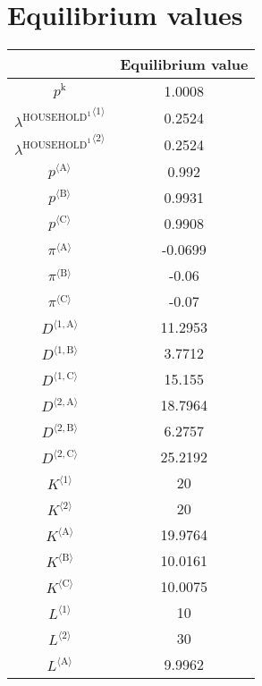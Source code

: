 

\section{Equilibrium values}


\begin{tabular}{c|c|}
  & Equilibrium value\\
\hline
$p^{\mathrm{k}}$ & 1.0008 \\
${\lambda^{\mathrm{HOUSEHOLD}^{\mathrm{1}}}}^{\langle \mathrm{1}\rangle}$ & 0.2524 \\
${\lambda^{\mathrm{HOUSEHOLD}^{\mathrm{1}}}}^{\langle \mathrm{2}\rangle}$ & 0.2524 \\
${p}^{\langle \mathrm{A}\rangle}$ & 0.992 \\
${p}^{\langle \mathrm{B}\rangle}$ & 0.9931 \\
${p}^{\langle \mathrm{C}\rangle}$ & 0.9908 \\
${\pi}^{\langle \mathrm{A}\rangle}$ & -0.0699 \\
${\pi}^{\langle \mathrm{B}\rangle}$ & -0.06 \\
${\pi}^{\langle \mathrm{C}\rangle}$ & -0.07 \\
${D}^{\langle \mathrm{1},\mathrm{A}\rangle}$ & 11.2953 \\
${D}^{\langle \mathrm{1},\mathrm{B}\rangle}$ & 3.7712 \\
${D}^{\langle \mathrm{1},\mathrm{C}\rangle}$ & 15.155 \\
${D}^{\langle \mathrm{2},\mathrm{A}\rangle}$ & 18.7964 \\
${D}^{\langle \mathrm{2},\mathrm{B}\rangle}$ & 6.2757 \\
${D}^{\langle \mathrm{2},\mathrm{C}\rangle}$ & 25.2192 \\
${K}^{\langle \mathrm{1}\rangle}$ & 20 \\
${K}^{\langle \mathrm{2}\rangle}$ & 20 \\
${K}^{\langle \mathrm{A}\rangle}$ & 19.9764 \\
${K}^{\langle \mathrm{B}\rangle}$ & 10.0161 \\
${K}^{\langle \mathrm{C}\rangle}$ & 10.0075 \\
${L}^{\langle \mathrm{1}\rangle}$ & 10 \\
${L}^{\langle \mathrm{2}\rangle}$ & 30 \\
${L}^{\langle \mathrm{A}\rangle}$ & 9.9962 \\

\end{tabular}
